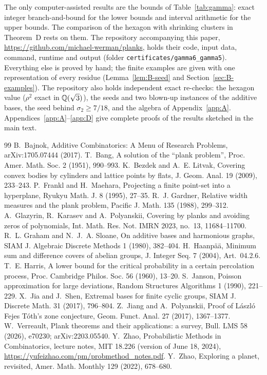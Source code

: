 \documentclass[11pt]{article}
\begin{document}
The only computer-assisted results are the bounds of Table~\ref{tab:gamma}: exact integer
branch-and-bound for the lower bounds and interval arithmetic for the upper bounds. The comparison of
the hexagon with shrinking clusters in Theorem~D rests on them. The repository accompanying this paper,
\url{https://github.com/michael-werman/planks}, holds their code, input data, command, runtime and output (folder
\texttt{certificates/\allowbreak gamma6\_\allowbreak gamma5}). Everything else is proved by hand; the finite examples are given
with one representation of every residue (Lemma~\ref{lem:B-seed} and Section~\ref{sec:B-examples}). The
repository also holds independent exact re-checks: the hexagon value ($\rho^2$ exact in $\mathbb{Q}(\sqrt3)$), the
seeds and two blown-up instances of the additive bases, the seed behind
$\sigma_2\ge7/18$, and the algebra of Appendix~\ref{app:A}. Appendices~\ref{app:A}--\ref{app:D} give
complete proofs of the results sketched in the main text.

\begin{thebibliography}{99}
 B.~Bajnok, Additive Combinatorics: A Menu of Research Problems, arXiv:1705.07444 (2017).
 T.~Bang, A solution of the ``plank problem'', Proc. Amer. Math. Soc. 2 (1951), 990--993.
 K.~Bezdek and A.~E. Litvak, Covering convex bodies by cylinders and lattice points by
flats, J. Geom. Anal. 19 (2009), 233--243.
 P.~Frankl and H.~Maehara, Projecting a finite point-set into a hyperplane, Ryukyu Math. J.
8 (1995), 27--35.
 R.~J. Gardner, Relative width measures and the plank problem, Pacific J. Math. 135
(1988), 299--312.
 A.~Glazyrin, R.~Karasev and A.~Polyanskii, Covering by planks and avoiding zeros of
polynomials, Int. Math. Res. Not. IMRN 2023, no.~13, 11684--11700.
 R.~L. Graham and N.~J.~A. Sloane, On additive bases and harmonious graphs, SIAM J.
Algebraic Discrete Methods 1 (1980), 382--404.
 H.~Haanpää, Minimum sum and difference covers of abelian groups, J. Integer Seq. 7
(2004), Art.~04.2.6.
 T.~E. Harris, A lower bound for the critical probability in a certain percolation
process, Proc. Cambridge Philos. Soc. 56 (1960), 13--20.
 S.~Janson, Poisson approximation for large deviations, Random Structures Algorithms 1
(1990), 221--229.
 X.~Jia and J.~Shen, Extremal bases for finite cyclic groups, SIAM J. Discrete Math. 31
(2017), 796--804.
 Z.~Jiang and A.~Polyanskii, Proof of László Fejes Tóth's zone conjecture, Geom. Funct.
Anal. 27 (2017), 1367--1377.
 W.~Verreault, Plank theorems and their applications: a survey, Bull. LMS 58 (2026),
e70230; arXiv:2203.05540.
 Y.~Zhao, Probabilistic Methods in Combinatorics, lecture notes, MIT 18.226 (version of June 18,
2024), \url{https://yufeizhao.com/pm/probmethod_notes.pdf}.
 Y.~Zhao, Exploring a planet, revisited, Amer. Math. Monthly 129 (2022), 678--680.
\end{thebibliography}

\appendix
{}
\end{document}
